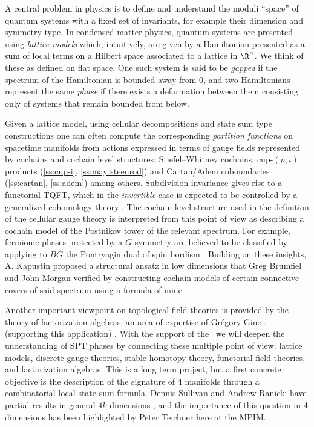 A central problem in physics is to define and understand the moduli ``space'' of quantum systems with a fixed set of invariants, for example their dimension and symmetry type.
In condensed matter physics, quantum systems are presented using \textit{lattice models} which, intuitively, are given by a Hamiltonian presented as a sum of local terms on a Hilbert space associated to a lattice in $\R^n$.
We think of these as defined on flat space.
One such system is said to be \textit{gapped} if the spectrum of the Hamiltonian is bounded away from $0$, and two Hamiltonians represent the same \textit{phase} if there exists a deformation between them consisting only of systems that remain bounded from below.

Given a lattice model, using cellular decompositions and state sum type constructions one can often compute the corresponding \textit{partition functions} on spacetime manifolds from actions expressed in terms of gauge fields represented by cochains and cochain level structures: Stiefel--Whitney cochains, cup-$(p, i)$ products (\cref{ss:cup-i}, \cref{ss:may steenrod}) and Cartan/Adem coboundaries (\cref{ss:cartan}, \cref{ss:adem}) among others.
Subdivision invariance gives rise to a functorial TQFT, which in the \textit{invertible} case is expected to be controlled by a generalized cohomology theory \cite{freed2021reflection}.
The cochain level structure used in the definition of the cellular gauge theory is interpreted from this point of view as describing a cochain model of the Postnikov tower of the relevant spectrum.
For example, fermionic phases protected by a $G$-symmetry are believed to be classified by applying to $BG$ the Pontryagin dual of spin bordism \cite{kapustin2015cobordism, kapustin2017fermionic}.
Building on these insights, A. Kapustin proposed a structural ansatz in low dimensions that Greg Brumfiel and John Morgan verified by constructing cochain models of certain connective covers of said spectrum \cite{brumfiel2016pontrjagin, brumfiel2018pontrjagin} using a formula of mine \cite{medina2020cartan}.

Another important viewpoint on topological field theories is provided by the theory of factorization algebras, an area of expertise of Gr\'egory Ginot (supporting this application) \cite{ginot2015factorization.algebras}.
With the support of the \grantName\ we will deepen the understanding of SPT phases by connecting these multiple point of view: lattice models, discrete gauge theories, stable homotopy theory, functorial field theories, and factorization algebras.
This is a long term project, but a first concrete objective is the description of the signature of 4 manifolds through a combinatorial local state sum formula.
Dennis Sullivan and Andrew Ranicki have partial results in general $4k$-dimensions \cite{sullivan1976signature}, and the importance of this question in 4 dimensions has been highlighted by Peter Teichner here at the MPIM.

